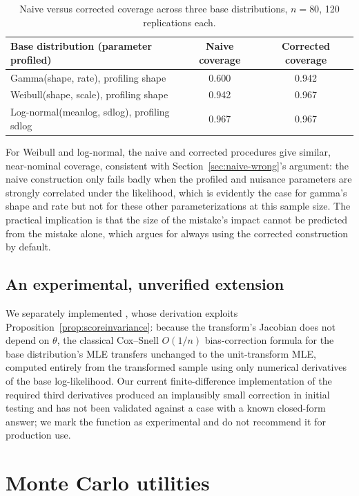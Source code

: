 \documentclass[article]{jss}
\begin{document}
\begin{table}[htbp]
\centering
\begin{tabular}{@{}lcc@{}}
\toprule
Base distribution (parameter profiled) & Naive coverage & Corrected coverage \\
\midrule
Gamma(shape, rate), profiling shape & 0.600 & 0.942 \\
Weibull(shape, scale), profiling shape & 0.942 & 0.967 \\
Log-normal(meanlog, sdlog), profiling sdlog & 0.967 & 0.967 \\
\bottomrule
\end{tabular}
\caption{Naive versus corrected coverage across three base distributions, $n=80$, 120 replications each.}
\label{tab:coverage-by-family}
\end{table}

For Weibull and log-normal, the naive and corrected procedures give similar, near-nominal coverage, consistent with Section~\ref{sec:naive-wrong}'s argument: the naive construction only fails badly when the profiled and nuisance parameters are strongly correlated under the likelihood, which is evidently the case for gamma's shape and rate but not for these other parameterizations at this sample size. The practical implication is that the size of the mistake's impact cannot be predicted from the mistake alone, which argues for always using the corrected construction by default.

\subsection{An experimental, unverified extension}

We separately implemented , whose derivation exploits Proposition~\ref{prop:scoreinvariance}: because the transform's Jacobian does not depend on $\theta$, the classical Cox--Snell \citep{coxsnell1968} $O(1/n)$ bias-correction formula for the base distribution's MLE transfers unchanged to the unit-transform MLE, computed entirely from the transformed sample using only numerical derivatives of the base log-likelihood. Our current finite-difference implementation of the required third derivatives produced an implausibly small correction in initial testing and has not been validated against a case with a known closed-form answer; we mark the function as experimental and do not recommend it for production use.

\section{Monte Carlo utilities}
\label{sec:montecarlo}
\end{document}
